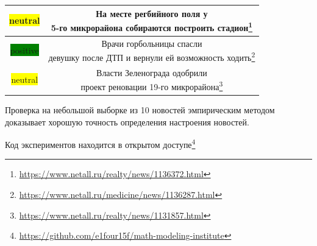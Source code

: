 \documentclass[12pt]{article}
\begin{document}
\begin{center}
\begin{tabular}{|c|c|}
                \hline
                \colorbox{yellow}{neutral} & \makecell{На месте регбийного поля у \\ 5-го микрорайона собираются построить стадион\footnote{\href{https://www.netall.ru/realty/news/1136372.html}{https://www.netall.ru/realty/news/1136372.html}}}\\
                \hline
                \colorbox{green}{positive} & \makecell{Врачи горбольницы спасли \\ девушку после ДТП и вернули ей возможность ходить\footnote{\href{https://www.netall.ru/medicine/news/1136287.html}{https://www.netall.ru/medicine/news/1136287.html}}}\\
                \hline
                \colorbox{yellow}{neutral} & \makecell{Власти Зеленограда одобрили \\ проект реновации 19-го микрорайона\footnote{\href{https://www.netall.ru/realty/news/1131857.html}{https://www.netall.ru/realty/news/1131857.html}}}\\
                \hline
                \end{tabular}
            \end{center}

            Проверка на небольшой выборке из 10 новостей эмпирическим методом доказывает хорошую точность определения настроения новостей.

            Код экспериментов находится в открытом доступе\footnote{\href{https://github.com/e1four15f/math-modeling-institute}{https://github.com/e1four15f/math-modeling-institute}}
\end{document}
